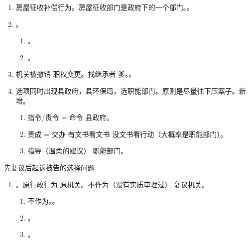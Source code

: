\begin{enumerate}
\begin{enumerate}
                \begin{enumerate}
                  \item 省政府 \hz 国务院批准设立的。开发区管理机构 \ydy 区政府、开发区管理机构职能部门 \ydy 政府某部门。
                  \item 不是。无授权 \ydy 临时机构。有 \ydy 授权内设、派出机构。
                \end{enumerate}
          \item 房屋征收补偿行为。房屋征收部门是政府下的一个部门。。
          \item {}。
                \begin{enumerate}
                  \item {}。
                  \item {}。
                \end{enumerate}
          \item 机关被撤销 \hz 职权变更。找继承者 \yjt 爹。。
          \item 选项同时出现县政府，县环保局，选职能部门。原则是尽量往下压案子。新增。
                \begin{enumerate}
                  \item 指令/责令 = 命令 \yjt 县政府。
                  \item 责成 = 交办 \yjt 有文书看文书 \yjt 没文书看行动（大概率是职能部门）。
                  \item 指导（温柔的建议） \yjt 职能部门。
                \end{enumerate}
        \end{enumerate}
        \begin{kk}{先复议后起诉被告的选择问题}
          \begin{enumerate}
            \item {}。原行政行为 \yjt 原机关。不作为（没有实质审理过） \yjt 复议机关。
                  \begin{enumerate}
                    \item 不作为。。
                    \item {}。
                    \item {}。

\end{enumerate}
\end{enumerate}
\end{kk}
\end{enumerate}

